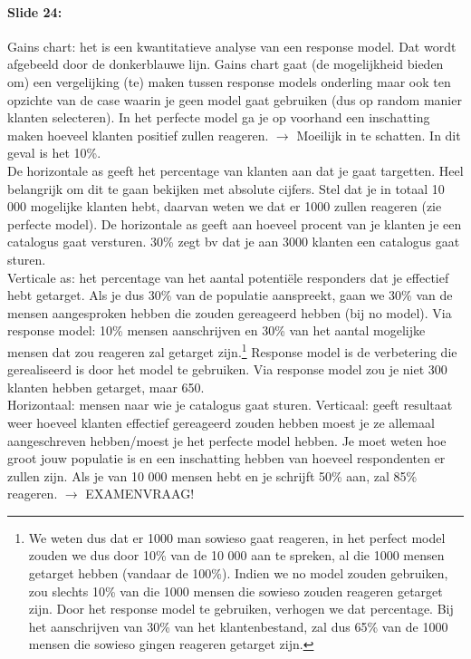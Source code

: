 \documentclass[10pt,a4paper]{report}
\begin{document}
\paragraph{Slide 24:}Gains chart: het is een kwantitatieve analyse van een response model. Dat wordt afgebeeld door de donkerblauwe lijn. Gains chart gaat (de mogelijkheid bieden om) een vergelijking (te) maken tussen response models onderling maar ook ten opzichte van de case waarin je geen model gaat gebruiken (dus op random manier klanten selecteren). In het perfecte model ga je op voorhand een inschatting maken hoeveel klanten positief zullen reageren. $\rightarrow$ Moeilijk in te schatten. In dit geval is het 10\%.\\
De horizontale as geeft het percentage van klanten aan dat je gaat targetten. Heel belangrijk om dit te gaan bekijken met absolute cijfers. Stel dat je in totaal 10 000 mogelijke klanten hebt, daarvan weten we dat er 1000 zullen reageren (zie perfecte model). De horizontale as geeft aan hoeveel procent van je klanten je een catalogus gaat versturen. 30\% zegt bv dat je aan 3000 klanten een catalogus gaat sturen.\\
Verticale as: het percentage van het aantal potentiële responders dat je effectief hebt getarget. Als je dus 30\% van de populatie aanspreekt, gaan we 30\% van de mensen aangesproken hebben die zouden gereageerd hebben (bij no model). Via response model: 10\% mensen aanschrijven en 30\% van het aantal mogelijke mensen dat zou reageren zal getarget zijn.\footnote{We weten dus dat er 1000 man sowieso gaat reageren, in het perfect model zouden we dus door 10\% van de 10 000 aan te spreken, al die 1000 mensen getarget hebben (vandaar de 100\%). Indien we no model zouden gebruiken, zou slechts 10\% van die 1000 mensen die sowieso zouden reageren getarget zijn. Door het response model te gebruiken, verhogen we dat percentage. Bij het aanschrijven van 30\% van het klantenbestand, zal dus 65\% van de 1000 mensen die sowieso gingen reageren getarget zijn.}
Response model is de verbetering die gerealiseerd is door het model te gebruiken. Via response model zou je niet 300 klanten hebben getarget, maar 650.\\
Horizontaal: mensen naar wie je catalogus gaat sturen. Verticaal: geeft resultaat weer hoeveel klanten effectief gereageerd zouden hebben moest je ze allemaal aangeschreven hebben/moest je het perfecte model hebben. Je moet weten hoe groot jouw populatie is en een inschatting hebben van hoeveel respondenten er zullen zijn. Als je van 10 000 mensen hebt en je schrijft 50\% aan, zal 85\% reageren. $\rightarrow$ EXAMENVRAAG!
\end{document}
